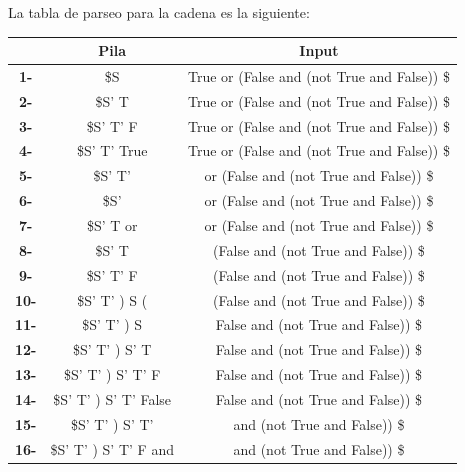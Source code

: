 \documentclass[12pt, letterpaper]{article}
\begin{document}
\begin{enumerate}
\begin{enumerate}[label=(\alph*)]
\begin{enumerate}[label=(\alph*)]
    La tabla de parseo para la cadena es la siguiente:
    \begin{table}[H]
      \centering
      \begin{tabular}{|c|c|c|}
        \hline
        & \textbf{Pila}                 & \textbf{Input}                              \\ \hline
        \textbf{1-}  & \$S                           & True or (False and (not True and False)) \$ \\ \hline
        \textbf{2-}  & \$S' T                        & True or (False and (not True and False)) \$ \\ \hline
        \textbf{3-}  & \$S' T' F                     & True or (False and (not True and False)) \$ \\ \hline
        \textbf{4-}  & \$S' T' True                  & True or (False and (not True and False)) \$ \\ \hline
        \textbf{5-}  & \$S' T'                       & or (False and (not True and False)) \$      \\ \hline
        \textbf{6-}  & \$S'                          & or (False and (not True and False)) \$      \\ \hline
        \textbf{7-}  & \$S' T or                     & or (False and (not True and False)) \$      \\ \hline
        \textbf{8-}  & \$S' T                        & (False and (not True and False)) \$         \\ \hline
        \textbf{9-}  & \$S' T' F                     & (False and (not True and False)) \$         \\ \hline
        \textbf{10-} & \$S' T' ) S (                 & (False and (not True and False)) \$         \\ \hline
        \textbf{11-} & \$S' T' ) S                   & False and (not True and False)) \$          \\ \hline
        \textbf{12-} & \$S' T' ) S' T                & False and (not True and False)) \$          \\ \hline
        \textbf{13-} & \$S' T' ) S' T' F             & False and (not True and False)) \$          \\ \hline
        \textbf{14-} & \$S' T' ) S' T' False         & False and (not True and False)) \$          \\ \hline
        \textbf{15-} & \$S' T' ) S' T'               & and (not True and False)) \$                \\ \hline
        \textbf{16-} & \$S' T' ) S' T' F and         & and (not True and False)) \$                \\ \hline

\end{tabular}
\end{table}
\end{enumerate}
\end{enumerate}
\end{enumerate}
\end{document}
